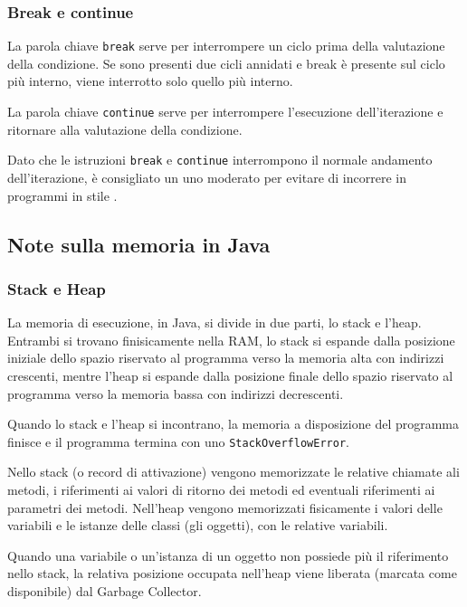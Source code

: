 \documentclass{article}
\begin{document}
\subsubsection*{Break e continue}
La parola chiave \verb|break| serve per interrompere un ciclo prima della valutazione della condizione. Se sono presenti due cicli annidati
e break è presente sul ciclo più interno, viene interrotto solo quello più interno.

La parola chiave \verb|continue| serve per interrompere l'esecuzione dell'iterazione e ritornare alla valutazione della condizione.

Dato che le istruzioni \verb|break| e \verb|continue| interrompono il normale andamento dell'iterazione, è consigliato un uno moderato
per evitare di incorrere in programmi in stile . 

\newpage


\subsection{Note sulla memoria in Java}
\subsubsection*{Stack e Heap}
La memoria di esecuzione, in Java, si divide in due parti, lo stack e l'heap. Entrambi si trovano finisicamente nella RAM, lo stack
si espande dalla posizione iniziale dello spazio riservato al programma verso la memoria alta con indirizzi crescenti, mentre l'heap
si espande dalla posizione finale dello spazio riservato al programma verso la memoria bassa con indirizzi decrescenti.

Quando lo stack e l'heap si incontrano, la memoria a disposizione del programma finisce e il programma termina con uno \verb|StackOverflowError|.

Nello stack (o record di attivazione) vengono memorizzate le relative chiamate ali metodi, i riferimenti ai valori di ritorno dei
metodi ed eventuali riferimenti ai parametri dei metodi. Nell'heap vengono memorizzati fisicamente i valori delle variabili e le
istanze delle classi (gli oggetti), con le relative variabili.

Quando una variabile o un'istanza di un oggetto non possiede più il riferimento nello stack, la relativa posizione occupata nell'heap
viene liberata (marcata come disponibile) dal Garbage Collector.
\end{document}
